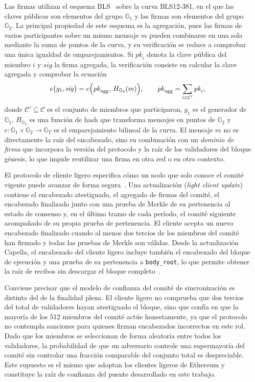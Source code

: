 Las firmas utilizan el esquema BLS~\cite{boneh2001short} sobre la curva BLS12-381, en el que las
claves públicas son elementos del grupo $\mathbb{G}_1$ y las firmas son elementos del grupo
$\mathbb{G}_2$. La principal propiedad de este esquema es la agregación, pues las firmas de
varios participantes sobre un mismo mensaje $m$ pueden combinarse en una sola mediante la suma
de puntos de la curva, y su verificación se reduce a comprobar una única igualdad de
emparejamientos. Si $\mathit{pk}_i$ denota la clave pública del miembro $i$ y $\mathit{sig}$ la
firma agregada, la verificación consiste en calcular la clave agregada y comprobar la ecuación
\begin{equation}
	\label{eq:bls_agregada}
	e\bigl(g_1, \mathit{sig}\bigr) = e\Bigl(\mathit{pk}_{\mathrm{agg}},\, H_{\mathbb{G}_2}(m)\Bigr),
	\qquad \mathit{pk}_{\mathrm{agg}} = \sum_{i \in \mathcal{C}' } \mathit{pk}_i,
\end{equation}
donde $\mathcal{C}' \subseteq \mathcal{C}$ es el conjunto de miembros que participaron, $g_1$ es
el generador de $\mathbb{G}_1$, $H_{\mathbb{G}_2}$ es una función de hash que transforma mensajes
en puntos de $\mathbb{G}_2$ y $e\colon \mathbb{G}_1 \times \mathbb{G}_2 \to \mathbb{G}_T$ es el
emparejamiento bilineal de la curva. El mensaje $m$ no es directamente la raíz del encabezado,
sino su combinación con un \textit{dominio de firma} que incorpora la versión del protocolo y la
raíz de los validadores del bloque génesis, lo que impide reutilizar una firma en otra red o en
otro contexto.

El protocolo de cliente ligero especifica cómo un nodo que solo conoce el comité vigente puede
avanzar de forma segura~\cite{ethlightclient}. Una actualización (\textit{light client update})
contiene el encabezado atestiguado, el agregado de firmas del comité, el encabezado finalizado
junto con una prueba de Merkle de su pertenencia al estado de consenso y, en el último tramo de
cada período, el comité siguiente acompañado de su propia prueba de pertenencia. El cliente
acepta un nuevo encabezado finalizado cuando al menos dos tercios de los miembros del comité han
firmado y todas las pruebas de Merkle son válidas. Desde la actualización Capella, el encabezado
del cliente ligero incluye también el encabezado del bloque de ejecución y una prueba de su
pertenencia a \texttt{body\_root}, lo que permite obtener la raíz de recibos sin descargar el
bloque completo~\cite{ethlightclientcapella}.

Conviene precisar que el modelo de confianza del comité de sincronización es distinto del de la
finalidad plena. El cliente ligero no comprueba que dos tercios del total de validadores hayan
atestiguado el bloque, sino que confía en que la mayoría de los 512 miembros del comité actúe
honestamente, ya que el protocolo no contempla sanciones para quienes firman encabezados
incorrectos en este rol. Dado que los miembros se seleccionan de forma aleatoria entre todos los
validadores, la probabilidad de que un adversario controle una supermayoría del comité sin
controlar una fracción comparable del conjunto total es despreciable. Este supuesto es el mismo
que adoptan los clientes ligeros de Ethereum y constituye la raíz de confianza del puente
desarrollado en este trabajo.

